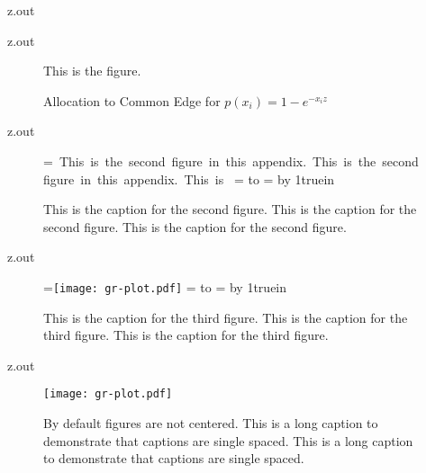 \begin{VerbatimOut}{z.out}

\end{VerbatimOut}

\MyIO


\begin{VerbatimOut}{z.out}

\begin{figure}[h]
  This is the figure.
  \caption{%
    Allocation to Common Edge for
    \(p(x_i) = 1-e^{-x_iz}\)%
  }
\end{figure}
\end{VerbatimOut}

\MyIO


\begin{VerbatimOut}{z.out}

\begin{sidewaysfigure}[ht]
  =\hbox{%
    \noindent
    This is the second figure in this appendix.
    This is the second figure in this appendix.
    This is%
  }
  =
  \hbox to \textwidth{\hss\box0\hss}
  \textwidth=
  \advance\textwidth by 1truein
  \caption{%
    This is the caption for the second figure.
    This is the caption for the second figure.
    This is the caption for the second figure.%
  }
\end{sidewaysfigure}
\end{VerbatimOut}

\MyIO


\begin{VerbatimOut}{z.out}

\begin{sidewaysfigure}[ht]
  =\hbox{\noindent \texttt{[image: gr-plot.pdf]}}
  =
  \hbox to \textwidth{\hss\box0\hss}
  \textwidth=
  \advance\textwidth by 1truein
  \caption{
    This is the caption for the third figure.
    This is the caption for the third figure.
    This is the caption for the third figure.%
  }
\end{sidewaysfigure}
\end{VerbatimOut}

\MyIO


\begin{VerbatimOut}{z.out}

\begin{figure}[ht]
  \texttt{[image: gr-plot.pdf]}
  \caption
  {%
    By default figures are not centered.
    This is a long caption to demonstrate that captions are single spaced.
    This is a long caption to demonstrate that captions are single spaced.%
  }
  \label{fi:not-centered}
\end{figure}
\end{VerbatimOut}

